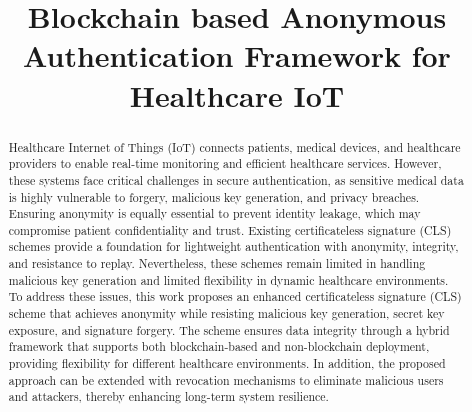 \documentclass[conference]{IEEEtran}
\begin{document}
\title{Blockchain based Anonymous Authentication Framework for Healthcare IoT\\

}

\author{
\and
{}
\and
{}
}

\maketitle

\begin{abstract}
Healthcare Internet of Things (IoT) connects patients, medical devices, and healthcare
providers to enable real-time monitoring and efficient healthcare services. However, these
systems face critical challenges in secure authentication, as sensitive medical data is highly
vulnerable to forgery, malicious key generation, and privacy breaches. Ensuring anonymity is
equally essential to prevent identity leakage, which may compromise patient confidentiality
and trust. Existing certificateless signature (CLS) schemes provide a foundation for
lightweight authentication with anonymity, integrity, and resistance to replay. Nevertheless,
these schemes remain limited in handling malicious key generation and limited flexibility in
dynamic healthcare environments. To address these issues, this work proposes an enhanced
certificateless signature (CLS) scheme that achieves anonymity while resisting malicious key
generation, secret key exposure, and signature forgery. The scheme ensures data integrity
through a hybrid framework that supports both blockchain-based and non-blockchain
deployment, providing flexibility for different healthcare environments. In addition, the
proposed approach can be extended with revocation mechanisms to eliminate malicious users
and attackers, thereby enhancing long-term system resilience.

\end{abstract}
\end{document}
